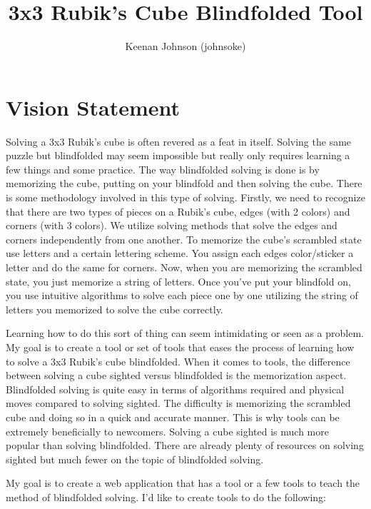 \documentclass[12pt]{article}
\title{3x3 Rubik's Cube Blindfolded Tool}
\author{Keenan Johnson (johnsoke)}
\begin{document}
\maketitle
\tableofcontents



\section{Vision Statement}
Solving a 3x3 Rubik’s cube is often revered as a feat in itself. Solving the same puzzle but blindfolded may seem impossible but really only requires learning a few things and some practice. The way blindfolded solving is done is by memorizing the cube, putting on your blindfold and then solving the cube. There is some methodology involved in this type of solving. Firstly, we need to recognize that there are two types of pieces on a Rubik’s cube, edges (with 2 colors) and corners (with 3 colors). We utilize solving methods that solve the edges and corners independently from one another.  To memorize the cube’s scrambled state use letters and a certain lettering scheme. You assign each edges color/sticker a letter and do the same for corners. Now, when you are memorizing the scrambled state, you just memorize a string of letters. Once you’ve put your blindfold on, you use intuitive algorithms to solve each piece one by one utilizing the string of letters you memorized to solve the cube correctly.


Learning how to do this sort of thing can seem intimidating or seen as a problem. My goal is to create a tool or set of tools that eases the process of learning how to solve a 3x3 Rubik’s cube blindfolded. When it comes to tools, the difference between solving a cube sighted versus blindfolded is the memorization aspect. Blindfolded solving is quite easy in terms of algorithms required and physical moves compared to solving sighted. The difficulty is memorizing the scrambled cube and doing so in a quick and accurate manner. This is why tools can be extremely beneficially to newcomers. Solving a cube sighted is much more popular than solving blindfolded. There are already plenty of resources on solving sighted but much fewer on the topic of blindfolded solving. 
  
   My goal is to create a web application that has a tool or a few tools to teach the method of blindfolded solving. I’d like to create tools to do the following:
 
\end{document}
